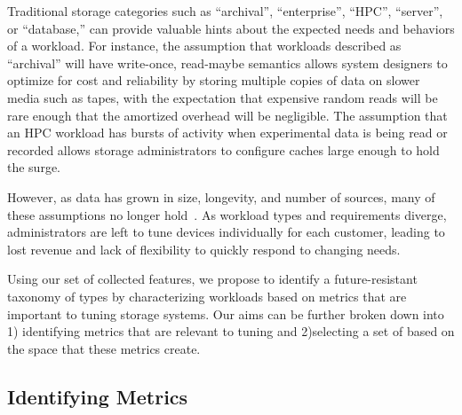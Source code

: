 Traditional storage categories such as 
``archival'', ``enterprise'', ``HPC'', ``server'', or ``database,'' can provide
valuable hints about the expected needs and behaviors of a workload.  For
instance, the assumption that workloads described as ``archival'' will have
write-once, read-maybe semantics allows system designers to optimize for cost
and reliability by storing multiple copies of data on slower media such as
tapes, with the expectation that expensive random reads will be rare enough that
the amortized overhead will be negligible.  The assumption that an HPC workload
has bursts of activity when experimental data is being read or recorded allows
storage administrators to configure caches large enough to hold the surge.

However, as data has grown in size, longevity, and number of sources, many of
these assumptions no longer hold~\cite{ian-tos,dwyer2012practical}.  As workload types and
requirements diverge, administrators are left to tune devices individually for
each customer, leading to lost revenue and lack of flexibility to quickly
respond to changing needs.  

Using our set of collected features, we propose to identify a future-resistant taxonomy
of \mW types by characterizing workloads based on metrics that are
important to tuning storage systems.  Our aims can be further broken down
into 1) identifying metrics that are relevant to tuning and 2)selecting a set of
\mws based on the space that these metrics create. 

\subsection{Identifying Metrics}


